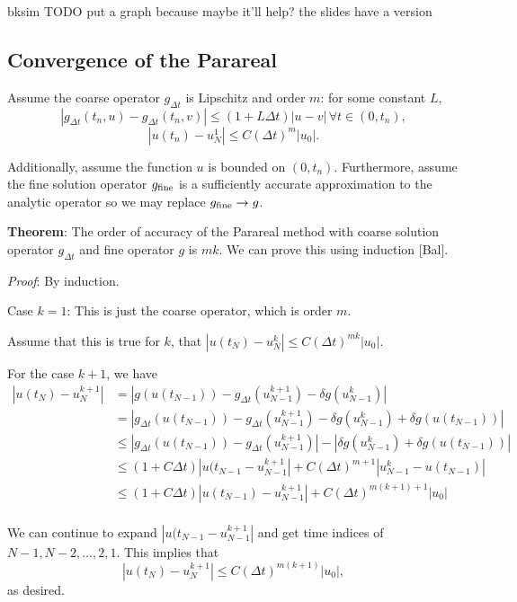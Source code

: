 \documentclass[letterpaper,12pt]{article}
\begin{document}
bksim TODO put a graph because maybe it'll help? the slides have a version

\subsection{Convergence of the Parareal}

Assume the coarse operator $g_{\Delta t}$ is Lipschitz and order $m$: for some
constant $L$, 
\[ |g_{\Delta t}(t_n, u) - g_{\Delta t}(t_n, v)| \leq (1 + L \Delta t) |u - v|
\, \forall t \in (0, t_n), \]
\[ |u(t_n) - u^1_N | \leq C(\Delta t)^m |u_0|. \]

Additionally, assume the function $u$ is bounded on $(0, t_n)$. Furthermore,
assume the fine solution operator $g_{\textnormal{fine}}$ is a sufficiently
accurate approximation to the analytic operator so we may replace
$g_{\textnormal{fine}} \to g$. 

\textbf{Theorem}: The order of accuracy of the Parareal method with coarse
solution operator $g_{\Delta t}$ and fine operator $g$ is $mk$. We can prove
this using induction [Bal]. 

\emph{Proof}: By induction. 

Case $k = 1$: This is just the coarse operator, which is order $m$. 

Assume that this is true for $k$, that $|u(t_N) - u^k_N| \leq C(\Delta t)^{mk}
|u_0|$. 

For the case $k + 1$, we have
\[
\begin{aligned}
    |u(t_N) - u^{k+1}_N| &= 
    |g(u(t_{N-1})) - g_{\Delta t}(u^{k+1}_{N-1}) - \delta g(u^k_{N-1})| \\
    &= |g_{\Delta t}(u(t_{N-1})) - g_{\Delta t}(u^{k+1}_{N-1}) - \delta
    g(u^k_{N-1}) + \delta g(u(t_{N-1}))| \\
    &\leq |g_{\Delta t}(u(t_{N-1})) - g_{\Delta t}(u^{k+1}_{N-1})| - |\delta
    g(u^k_{N-1}) + \delta g(u(t_{N-1}))| \\
    &\leq (1 + C \Delta t) |u(t_{N-1} - u_{N-1}^{k+1}| + C(\Delta t)^{m+1} |
    u_{N-1}^k - u(t_{N-1}) | \\
    &\leq (1 + C \Delta t) |u(t_{N-1}) - u_{N-1}^{k+1}| + C(\Delta t)^{m(k+1)+1}
    | u_0 | \\
\end{aligned}
\]

We can continue to expand $|u(t_{N-1} - u_{N-1}^{k+1}|$ and get time indices of
$N-1, N-2, \ldots, 2, 1$. This implies that 
\[ |u(t_N) - u^{k+1}_N| \leq C(\Delta t)^{m(k+1)} |u_0|, \]
as desired. 
\end{document}
